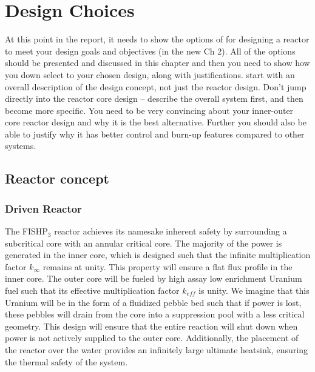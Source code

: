 \documentclass[12pt]{article}
\begin{document}
\begin{itemize}
\end{itemize}
\section{Design Choices}
At this point in the report, it needs to show the options of for designing a reactor to meet your design goals and objectives (in the new Ch 2). All of the options should be presented and discussed in this chapter and then you need to show how you down select to your chosen design, along with justifications.
 start with an overall description of the design concept, not just the reactor design. Don’t jump directly into the reactor core design – describe the overall system first, and then become more specific.
 You need to be very convincing about your inner-outer core reactor design and why it is the best alternative. Further you should also be able to justify why it has better control and burn-up features compared to other systems.
\subsection{Reactor concept}
\subsubsection{Driven Reactor}
The FISHP$_3$ reactor achieves its namesake inherent safety by surrounding a subcritical core with an annular critical core. The majority of the power is generated in the inner core, which is designed such that the infinite multiplication factor $k_\infty$ remains at unity. This property will ensure a flat flux profile in the inner core. The outer core will be fueled by high assay low enrichment Uranium fuel such that its effective multiplication factor $k_{eff}$ is unity. We imagine that this Uranium will be in the form of a fluidized pebble bed such that if power is lost, these pebbles will drain from the core into a suppression pool with a less critical geometry. This design will ensure that the entire reaction will shut down when power is not actively supplied to the outer core. Additionally, the placement of the reactor over the water provides an infinitely large ultimate heatsink, ensuring the thermal safety of the system.
\end{document}
